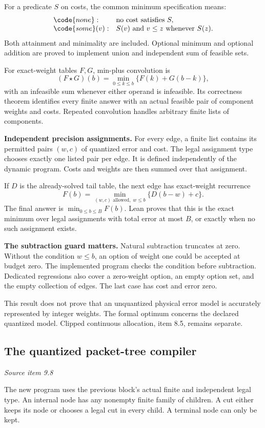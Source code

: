 For a predicate $S$ on costs, the common minimum specification means:
\[
\begin{array}{ll}
\code{none}: & \text{no cost satisfies }S,\\
\code{some}(v): & S(v)\text{ and }v\leq z\text{ whenever }S(z).
\end{array}
\]
Both attainment and minimality are included. Optional minimum and optional addition are proved to implement union and independent sum of feasible sets.

For exact-weight tables $F,G$, min-plus convolution is
\[
(F\star G)(b)=\min_{0\leq k\leq b}\{F(k)+G(b-k)\},
\]
with an infeasible sum whenever either operand is infeasible. Its correctness theorem identifies every finite answer with an actual feasible pair of component weights and costs. Repeated convolution handles arbitrary finite lists of components.

\textbf{Independent precision assignments.} For every edge, a finite list contains its permitted pairs $(w,c)$ of quantized error and cost. The legal assignment type chooses exactly one listed pair per edge. It is defined independently of the dynamic program. Costs and weights are then summed over that assignment.

If $D$ is the already-solved tail table, the next edge has exact-weight recurrence
\[
F(b)=\min_{(w,c)\text{ allowed},\;w\leq b}\{D(b-w)+c\}.
\]
The final answer is $\min_{0\leq b\leq B}F(b)$. Lean proves that this is the exact minimum over legal assignments with total error at most $B$, or  exactly when no such assignment exists.

\textbf{The subtraction guard matters.} Natural subtraction truncates at zero. Without the condition $w\leq b$, an option of weight one could be accepted at budget zero. The implemented program checks the condition before subtraction. Dedicated regressions also cover a zero-weight option, an empty option set, and the empty collection of edges. The last case has cost and error zero.

This result does not prove that an unquantized physical error model is accurately represented by integer weights. The formal optimum concerns the declared quantized model. Clipped continuous allocation, item 8.5, remains separate.



\subsection{The quantized packet-tree compiler}\label{supp3:subsection:005}\textit{Source item 9.8}\par
The new program uses the previous block's actual finite  and independent legal  type. An internal node has any nonempty finite family of children. A cut either keeps its node or chooses a legal cut in every child. A terminal node can only be kept.

